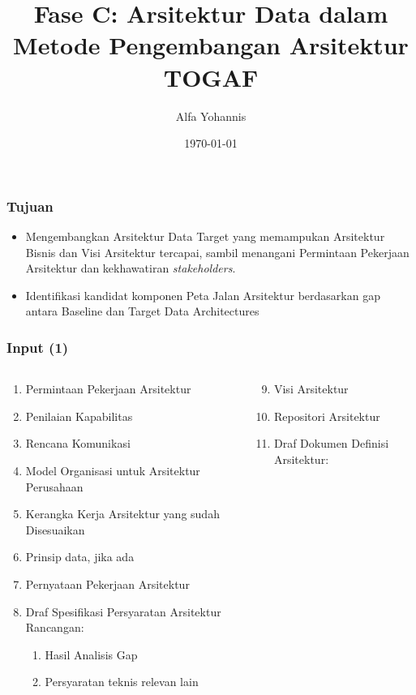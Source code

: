 \documentclass[aspectratio=169]{beamer}
\title{Fase C: Arsitektur Data dalam Metode Pengembangan Arsitektur TOGAF}
\author{Alfa Yohannis}
\date{\today}
\begin{document}
	
	\frame{\titlepage}
	
	\begin{frame}
		\frametitle{Tujuan}
		\begin{itemize}
			\item Mengembangkan Arsitektur Data Target yang memampukan Arsitektur Bisnis dan Visi Arsitektur tercapai, sambil menangani Permintaan Pekerjaan Arsitektur dan kekhawatiran \textit{stakeholders}.
			\item Identifikasi kandidat komponen Peta Jalan Arsitektur berdasarkan gap antara Baseline dan Target Data Architectures
		\end{itemize}
	\end{frame}
	
	\begin{frame}
		\frametitle{Input (1)}
		\begin{columns}
			\begin{column}{0.5\textwidth}
				\begin{center}
					\begin{enumerate}
						\item Permintaan Pekerjaan Arsitektur
						\item Penilaian Kapabilitas
						\item Rencana Komunikasi
						\item Model Organisasi untuk Arsitektur Perusahaan
						\item Kerangka Kerja Arsitektur yang sudah Disesuaikan
						\item Prinsip data, jika ada
						\item Pernyataan Pekerjaan Arsitektur
						\item Draf Spesifikasi Persyaratan Arsitektur Rancangan:
						\begin{enumerate}
							\item Hasil Analisis Gap
							\item Persyaratan teknis relevan lain
						\end{enumerate}
					\end{enumerate}
				\end{center}
			\end{column}
			\begin{column}{0.5\textwidth}
				\begin{center}
					\begin{enumerate}
						\setcounter{enumi}{8}
						\item Visi Arsitektur
						\item Repositori Arsitektur
						\item Draf Dokumen Definisi Arsitektur:

\end{enumerate}
\end{center}
\end{column}
\end{columns}
\end{frame}
\end{document}
